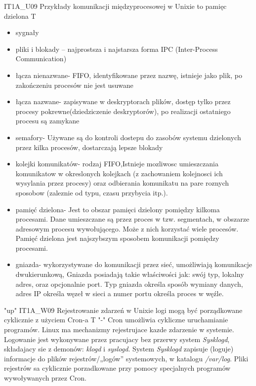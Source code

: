 \answer
{IT1A\_U09 Przykłady komunikacji międzyprocesowej w Unixie to}
{pamięc dzielona}
{T}
{
\begin{itemize}
\item sygnały
\item pliki i blokady – najprostsza i najstarsza forma IPC (Inter-Process Communication)
\item łącza nienazwane- FIFO, identyfikowane przez nazwę, istnieje jako plik, po zakończeniu procesów nie jest usuwane
\item łącza nazwane- zapisywane w deskryptorach plików, dostęp tylko przez procesy pokrewne(dziedziczenie deskryptorów), po realizacji ostatniego procesu są zamykane
\item semafory- Używane są do kontroli dostepu do zasobów systemu dzielonych przez kilka procesów, dostarczają lepsze blokady
\item kolejki komunikatów- rodzaj FIFO,Istnieje mozliwosc umieszczania komunikatow w okreslonych kolejkach (z zachowaniem kolejnosci ich wysylania przez procesy) oraz odbierania komunikatu na pare roznych sposobow (zaleznie od typu, czasu przybycia itp.).
\item pamięć dzielona- Jest to obszar pamięci dzielony pomiędzy kilkoma procesami. Dane umieszczane są przez proces w tzw. segmentach, w obszarze adresowym procesu wywołującego. Może z nich korzystać wiele procesów. Pamięć dzielona jest najszybszym sposobem komunikacji pomiędzy procesami.
\item gniazda- wykorzystywane do komunikacji przez sieć, umożliwiają komunikacje dwukierunkową, Gniazda posiadają takie właściwości jak: swój typ, lokalny adres, oraz opcjonalnie port. Typ gniazda określa sposób wymiany danych, adres IP określa węzeł w sieci a numer portu określa proces w węźle.
\end{itemize}
}
{"up"}
\answer
{ IT1A\_W09 Rejestrowanie zdarzeń w Unixie}
{logi mogą być porządkowane cyklicznie z użyciem Cron-a}
{T}
{"-"}
{Cron umożliwia cykliczne uruchamianie programów. Linux ma mechanizmy rejestrujace kazde zdarzenie w systemie. Logowanie jest wykonywane przez pracujacy bez przerwy system \textit{Sysklogd}, składajacy sie z demonów: \textit{klogd} i \textit{syslogd}.
System \textit{Sysklogd} zapisuje (loguje) informacje do plików rejestrów/„logów”
systemowych, w katalogu \textit{/var/log}.
Pliki rejestrów sa cyklicznie porzadkowane przy pomocy specjalnych programów wywoływanych przez Cron.
}

